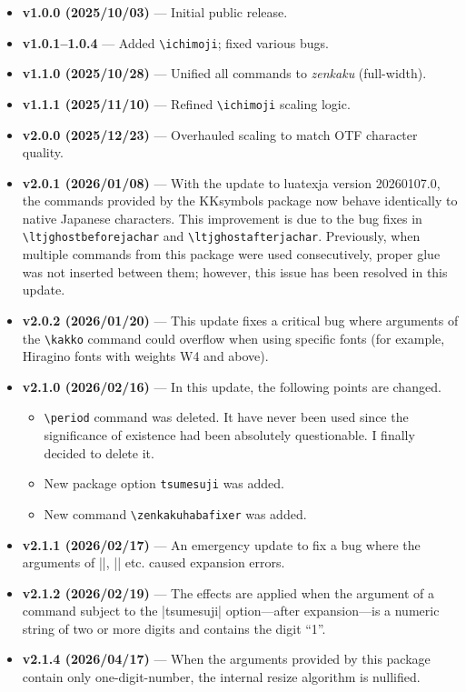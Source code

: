 \documentclass[luatex,fontsize=8pt,paper=b5,twoside]{jlreq}%
\begin{document}
\begin{itemize}
  \item \textbf{v1.0.0 (2025/10/03)} --- Initial public release.
  \item \textbf{v1.0.1--1.0.4} --- Added \verb|\ichimoji|; fixed various bugs.
  \item \textbf{v1.1.0 (2025/10/28)} --- Unified all commands to \textit{zenkaku} (full-width).
  \item \textbf{v1.1.1 (2025/11/10)} --- Refined \verb|\ichimoji| scaling logic.
  \item \textbf{v2.0.0 (2025/12/23)} --- Overhauled scaling to match OTF character quality.
  \item \textbf{v2.0.1 (2026/01/08)} --- With the update to luatexja version 20260107.0, the commands provided by the KKsymbols package now behave identically to native Japanese characters. This improvement is due to the bug fixes in \verb|\ltjghostbeforejachar| and \verb|\ltjghostafterjachar|. Previously, when multiple commands from this package were used consecutively, proper glue was not inserted between them; however, this issue has been resolved in this update.
  \item \textbf{v2.0.2 (2026/01/20)} --- This update fixes a critical bug where arguments of the \verb|\kakko| command could overflow when using specific fonts (for example, Hiragino fonts with weights W4 and above). 
  \item \textbf{v2.1.0 (2026/02/16)} --- In this update, the following points are changed.
  \begin{itemize}
    \item \verb|\period| command was deleted. It have never been used since the significance of existence had been absolutely questionable. I finally decided to delete it.
    \item New package option \verb|tsumesuji| was added. 
    \item New command \verb|\zenkakuhabafixer| was added.
  \end{itemize}
  \item \textbf{v2.1.1 (2026/02/17)} --- An emergency update to fix a bug where the arguments of \KKverb|\kakko|, \KKverb|\maru| etc. caused expansion errors.
  \item \textbf{v2.1.2 (2026/02/19)} --- The effects are applied when the argument of a command subject to the \KKverb|tsumesuji| option—after expansion—is a numeric string of two or more digits and contains the digit ``1''.
  \item \textbf{v2.1.4 (2026/04/17)} --- When the arguments provided by this package contain only one-digit-number, the internal resize algorithm is nullified.

\end{itemize}
\end{document}
